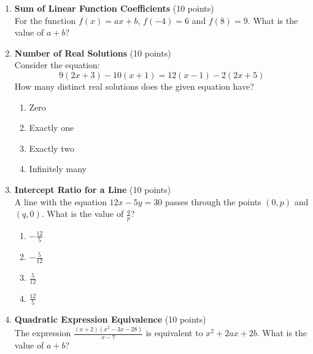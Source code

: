 \begin{enumerate}
  

  \item \textbf{Sum of Linear Function Coefficients} (10 points)\\
  For the function $f(x) = a x + b$, $f(-4) = 6$ and $f(8) = 9$. What is the value of $a + b$?
  \begin{subanswer}
  \end{subanswer}


  
  
  \item \textbf{Number of Real Solutions} (10 points)\\
  Consider the equation:
  \[
    9(2x+3) - 10(x+1) = 12(x-1) - 2(2x+5)
  \]
  How many distinct real solutions does the given equation have?
  \begin{enumerate}[label=(\Alph*)]
    \item Zero
    \item Exactly one
    \item Exactly two
    \item Infinitely many
  \end{enumerate}
  \begin{subanswer}
  \end{subanswer}


  \newpage


  \item \textbf{Intercept Ratio for a Line} (10 points)\\
  A line with the equation $12x - 5y = 30$ passes through the points $(0, p)$ and $(q, 0)$. What is the value of $\frac{q}{p}$?
  \begin{enumerate}[label=(\Alph*)]
    \item $-\frac{12}{5}$
    \item $-\frac{5}{12}$
    \item $\frac{5}{12}$
    \item $\frac{12}{5}$
  \end{enumerate}
  \begin{subanswer}
  \end{subanswer}


  

  \item \textbf{Quadratic Expression Equivalence} (10 points)\\
  The expression $\frac{(x+2)(x^2-3x-28)}{x-7}$ is equivalent to $x^2 + 2a x + 2b$. What is the value of $a + b$?
  \begin{subanswer}
  \end{subanswer}



\end{enumerate}
